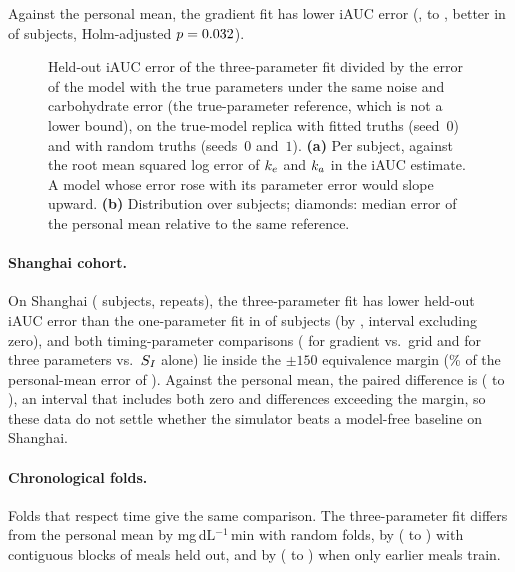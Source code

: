 Against the personal mean, the gradient fit has lower iAUC error (\resDiffGradThreeVsPersonalMean{},
\resDiffGradThreeVsPersonalMeanLow{} to \resDiffGradThreeVsPersonalMeanHigh, better in
\resWinsGradThreeVsPersonalMean{} of \resSubjectsOne{} subjects, Holm-adjusted $p=0.032$).

\begin{figure}[tbp]
\centering
{}
\caption{Held-out iAUC error of the three-parameter fit divided by the error of the model with the true parameters under the same noise and carbohydrate error (the true-parameter reference, which is not a lower bound),
on the true-model replica with fitted truths (seed~$0$) and with random truths (seeds~$0$ and~$1$).
\textbf{(a)} Per subject, against the root mean squared log error of $k_e$ and $k_a$ in the iAUC estimate. A model
whose error rose with its parameter error would slope upward. \textbf{(b)} Distribution over subjects; diamonds:
median error of the personal mean relative to the same reference.}
\label{fig:pvp}
\end{figure}

\paragraph{Shanghai cohort.}
On Shanghai (\resShCvSubjects{} subjects, \resShCvRepeats{} repeats), the three-parameter fit has lower held-out iAUC error than the one-parameter fit in \resShCvWinsGradThreeVsGradOne{} of \resShCvSubjects{} subjects (by \resShCvDiffGradThreeVsGradOne{}, interval excluding zero), and both timing-parameter comparisons (\resShCvDiffGradThreeVsGridThree{} for gradient vs.\ grid and \resShCvDiffGradThreeVsGradOne{} for three parameters vs.\ $S_I$ alone) lie inside the $\pm 150$ equivalence margin (\resShCvMarginShare\% of the personal-mean error of \resShCvMaePersonalMean{}).
Against the personal mean, the paired difference is \resShCvDiffGradThreeVsPersonalMean{} (\resShCvDiffGradThreeVsPersonalMeanLow{} to \resShCvDiffGradThreeVsPersonalMeanHigh), an interval that includes both zero and differences exceeding the margin, so these data do not settle whether the simulator beats a model-free baseline on Shanghai.

\paragraph{Chronological folds.}
Folds that respect time give the same comparison. The three-parameter fit differs from the personal mean by
\resChronoRandomDiffMean{} mg\,dL$^{-1}$\,min with random folds, by \resChronoBlockedDiffMean{}
(\resChronoBlockedDiffMeanLow{} to \resChronoBlockedDiffMeanHigh) with contiguous blocks of meals held out, and by
\resChronoForwardDiffMean{} (\resChronoForwardDiffMeanLow{} to \resChronoForwardDiffMeanHigh) when only earlier meals train.

